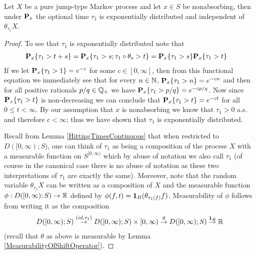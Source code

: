 \begin{lem}\label{PureJumpFirstJumpTime}Let $X$ be a pure jump-type Markov process and let $x \in
  S$ be nonabsorbing, then under $\probabilityop_x$ the optional time
  $\tau_1$ is exponentially distributed and independent of $\theta_{\tau_1}X$.
\end{lem}
\begin{proof}
To see that $\tau_1$ is exponentially distributed note that
\begin{align*}
\sprobability{\tau_1 > t+s}{x} &= \sprobability{\tau_1 > s; \tau_1
  \circ \theta_s > t}{x} = \sprobability{\tau_1 > s}{x} \sprobability{\tau_1 > t}{x} 
\end{align*}
If we let $\sprobability{\tau_1 > 1}{x} = e^{-c}$ for some $c \in [0,
\infty]$, then from this functional equation we immediately see that for every $n \in
\naturals$, $\sprobability{\tau_1 > n}{x} = e^{-cn}$ and then for all
positive rationals $p/q \in \rationals_+$ we have
$\sprobability{\tau_1 > p/q}{x} = e^{-cp/q}$.  Now since
$\sprobability{\tau_1 > t}{x}$ is non-decreasing we can conclude that
$\sprobability{\tau_1 > t}{x} = e^{-ct}$ for all $0 \leq t < \infty$.
By our assumption that $x$ is nonabsorbing we know that $\tau_1 > 0$
a.s. and therefore $c < \infty$; thus we have shown that $\tau_1$ is
exponentially distributed.

Recall from Lemma
\ref{HittingTimesContinuous} that when restricted to
$D([0,\infty);S)$, one can think of $\tau_1$
as being a composition of the process $X$ with a measurable function on
$S^{[0,\infty)}$ which by abuse of notation we also call $\tau_1$
(of course in the canonical case there is no abuse of notation as
these two interpretations of $\tau_1$ are exactly the same).  
Moreover, note that the random variable $\theta_{\tau_1 }X$
can be written as a composition of $X$ and the measurable function
$\phi : D([0,\infty) ; S) \to \reals$ defined by $\phi(f,t) =
\characteristic{B}(\theta_{\tau_1(f)}f)$. Measurability of $\phi$
follows from writing it as the composition 
\begin{align*}
D([0,\infty) ; S) \overset{(id, \tau_1)}  \to D([0,\infty) ; S) \times
[0, \infty)
\overset{\theta} \to D([0,\infty) ; S) \overset{\characteristic{B}}
\to \reals
\end{align*}
(recall that $\theta$ as above is measurable by Lemma \ref{MeasurabilityOfShiftOperator}).


\end{proof}
